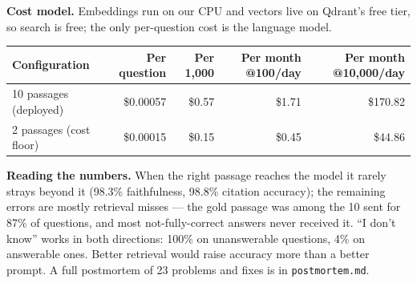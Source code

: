 \documentclass[10pt]{article}
\begin{document}
\noindent\textbf{Cost model.} Embeddings run on our CPU and vectors live on Qdrant's free tier, so search is free; the only
per-question cost is the language model.

\begin{center}
\footnotesize
\begin{tabular}{@{}lrrrr@{}}
\toprule
\textbf{Configuration} & \textbf{Per question} & \textbf{Per 1,000} & \textbf{Per month @100/day} & \textbf{Per month @10,000/day} \\
\midrule
10 passages (deployed) & \$0.00057 & \$0.57 & \$1.71 & \$170.82 \\
2 passages (cost floor) & \$0.00015 & \$0.15 & \$0.45 & \$44.86 \\
\bottomrule
\end{tabular}
\end{center}

\noindent\textbf{Reading the numbers.} When the right passage reaches the model it rarely strays beyond it (98.3\%
faithfulness, 98.8\% citation accuracy); the remaining errors are mostly retrieval misses --- the gold passage was among the
10 sent for 87\% of questions, and most not-fully-correct answers never received it. ``I don't know'' works in both
directions: 100\% on unanswerable questions, 4\% on answerable ones. Better retrieval would raise accuracy more than a better
prompt. A full postmortem of 23 problems and fixes is in \texttt{postmortem.md}.
\end{document}
